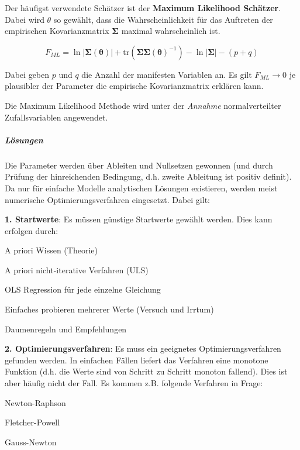 \documentclass{article}
\numberwithin{equation}{section}
\begin{document}
Der häufigst verwendete Schätzer ist der \textbf{Maximum Likelihood Schätzer}. Dabei wird $\theta$ so gewählt, dass die Wahrscheinlichkeit für das Auftreten der empirischen Kovarianzmatrix $\boldsymbol \Sigma$ maximal wahrscheinlich ist.

\begin{equation}
F_{ML} = \ln |\boldsymbol \Sigma ( \boldsymbol \theta )| + \text{tr} ( \boldsymbol{\Sigma\Sigma} (\boldsymbol \theta)^{-1} ) - \ln | \boldsymbol \Sigma | - (p+q)
\end{equation}

Dabei geben $p$ und $q$ die Anzahl der manifesten Variablen an. Es gilt $F_{ML} \to 0$ je plausibler der Parameter die empirische Kovarianzmatrix erklären kann.

Die Maximum Likelihood Methode wird unter der \emph{Annahme} normalverteilter Zufallsvariablen angewendet.

\subparagraph*{Lösungen}

Die Parameter werden über Ableiten und Nullsetzen gewonnen (und durch Prüfung der hinreichenden Bedingung, d.h. zweite Ableitung ist positiv definit). Da nur für einfache Modelle analytischen Lösungen existieren, werden meist numerische Optimierungsverfahren eingesetzt. Dabei gilt:

\textbf{1. Startwerte}: Es müssen günstige Startwerte gewählt werden. Dies kann erfolgen durch:

\begin{compactitem}
\item A priori Wissen (Theorie)
\item A priori nicht-iterative Verfahren (ULS)
\item OLS Regression für jede einzelne Gleichung
\item Einfaches probieren mehrerer Werte (Versuch und Irrtum)
\item Daumenregeln und Empfehlungen
\end{compactitem}

\textbf{2. Optimierungsverfahren}: Es muss ein geeignetes Optimierungsverfahren gefunden werden. In einfachen Fällen liefert das Verfahren eine monotone Funktion (d.h. die Werte sind von Schritt zu Schritt monoton fallend). Dies ist aber häufig nicht der Fall. Es kommen z.B. folgende Verfahren in Frage:

\begin{compactitem}
\item Newton-Raphson
\item Fletcher-Powell
\item Gauss-Newton
\end{compactitem}
\end{document}
